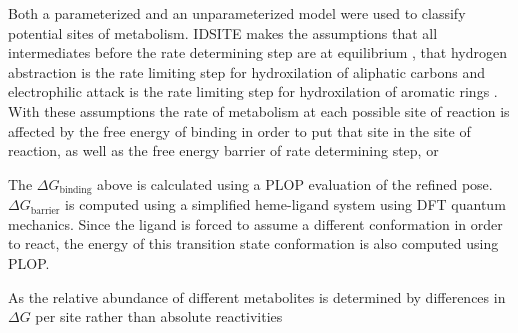 Both a parameterized and an unparameterized model were used to classify potential sites of metabolism.
IDSITE makes the assumptions that all intermediates before the rate determining step are at equilibrium \cite{wang2007stochastic}, that hydrogen abstraction is the rate limiting step for hydroxilation of aliphatic carbons and electrophilic attack is the rate limiting step for hydroxilation of aromatic rings \cite{guengerich2001common,shaik2005theoretical}.
With these assumptions the rate of metabolism at each possible site of reaction is affected by the free energy of binding in order to put that site in the site of reaction, as well as the free energy barrier of rate determining step, or


The ${\Delta}G_{\mathrm{binding}}$ above is calculated using a PLOP evaluation of the refined pose.
${\Delta}G_{\mathrm{barrier}}$ is computed using a simplified heme-ligand system using DFT quantum mechanics.
Since the ligand is forced to assume a different conformation in order to react, the energy of this transition state conformation is also computed using PLOP.


As the relative abundance of different metabolites is determined by differences in ${\Delta}G$ per site rather than absolute reactivities
